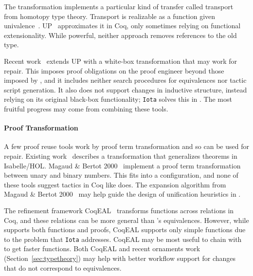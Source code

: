 The \toolnamec transformation implements a particular kind of transfer called transport from homotopy type theory.
Transport is realizable as a function given univalence~\cite{univalent2013homotopy}.
UP~\cite{tabareau2017equivalences} approximates it
in Coq, only sometimes relying on functional extensionality.
While powerful, neither approach removes references to the old type. %

Recent work~\cite{tabareau2019marriage} extends UP with 
a white-box transformation that may work for repair.
This imposes proof obligations on the proof engineer beyond those imposed by \toolnamec,
and it includes neither search procedures for equivalences nor tactic script generation.
It also does not support changes in inductive structure,
instead relying on its original black-box functionality;
\lstinline{Iota} solves this in \toolnamec. %
The most fruitful progress may come from combining these tools. %

\paragraph{Proof Transformation}
A few proof reuse tools work by proof term transformation and so can be used for repair. %
Existing work~\cite{Johnsen2004} describes a transformation that generalizes theorems in Isabelle/HOL.
Magaud \& Bertot 2000~\cite{magaud2000changing} implement a proof term transformation between
unary and binary numbers. 
This fits into a \toolnamec configuration,
and none of these tools suggest tactics in Coq like \toolnamec does.
The expansion algorithm from Magaud \& Bertot 2000~\cite{magaud2000changing} may help guide the design
of unification heuristics in \toolnamec.

The refinement framework CoqEAL~\cite{cohen:hal-01113453} transforms functions across relations in Coq,
and these relations can be more general than \toolnamec's equivalences.
However, while \toolnamec supports both functions and proofs, CoqEAL supports only simple functions
due to the problem that \lstinline{Iota} addresses.
CoqEAL may be most useful to chain with \toolnamec to get faster functions.
Both CoqEAL and recent ornaments work (Section~\ref{sec:typetheory}) may help with
better workflow support for changes that do not correspond to equivalences.

